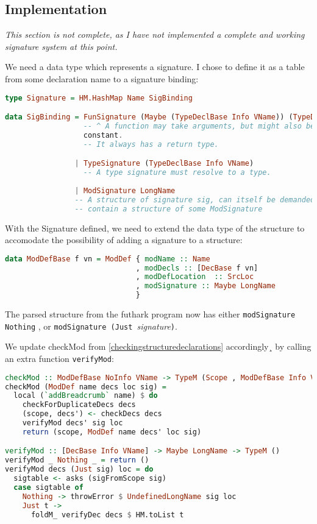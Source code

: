 \subsection{Implementation}
\textit{This section is not complete, as I have not implemented a complete and working
signature system at this point.
}

We need a data type which represents a signature.
I chose to define it as a table from some declaration name to a signature
binding:
\begin{lstlisting}[language=Haskell]
type Signature = HM.HashMap Name SigBinding

data SigBinding = FunSignature (Maybe (TypeDeclBase Info VName)) (TypeDeclBase Info VName)
                  -- ^ A function may take arguments, but might also be a
                  constant.
                  -- It always has a return type.

                | TypeSignature (TypeDeclBase Info VName)
                  -- A type signature must resolve to a type.  
                  
                | ModSignature LongName
                -- A structure of signature sig, can itself be demanded to
                -- contain a structure of some ModSignature
\end{lstlisting}

With the Signature defined, we need to extend the data type of the structure to
accomodate the possibility of adding a signature to a structure:

\begin{lstlisting}[language=Haskell]
data ModDefBase f vn = ModDef { modName :: Name
                              , modDecls :: [DecBase f vn]
                              , modDefLocation  :: SrcLoc
                              , modSignature :: Maybe LongName
                              }
\end{lstlisting}
The parsed structure from the futhark program now has either
\texttt{modSignature Nothing} , or \texttt{modSignature (Just }\textit{signature}\texttt{)}.

We update checkMod from \ref{checkingstructuredeclarations} accordingly¸ by
calling an extra function \texttt{verifyMod}:

\begin{lstlisting}[language=Haskell]
checkMod :: ModDefBase NoInfo VName -> TypeM (Scope , ModDefBase Info VName)
checkMod (ModDef name decs loc sig) =
  local (`addBreadcrumb` name) $ do
    checkForDuplicateDecs decs
    (scope, decs') <- checkDecs decs
    verifyMod decs' sig loc
    return (scope, ModDef name decs' loc sig)

verifyMod :: [DecBase Info VName] -> Maybe LongName -> TypeM ()
verifyMod _ Nothing _ = return ()
verifyMod decs (Just sig) loc = do
  sigtable <- asks (sigFromScope sig)
  case sigtable of
    Nothing -> throwError $ UndefinedLongName sig loc
    Just t ->
      foldM_ verifyDec decs $ HM.toList t
\end{lstlisting}

